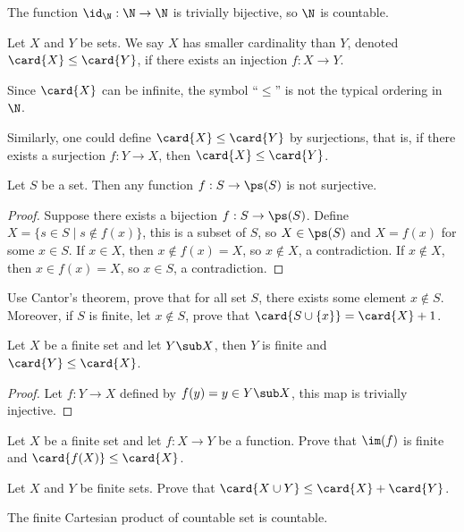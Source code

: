 \documentclass[10pt]{article}
\begin{document}
\par
The function ${\id}_{\N}:\N\to\N$ is trivially bijective, so $\N$ is countable.
\begin{definition}
    Let $X$ and $Y$ be sets. We say $X$ has smaller cardinality than $Y$, denoted $\card{X}\le\card{Y}$, if there exists an injection $f:X\to Y$.
\end{definition}
\begin{remark}
    Since $\card{X}$ can be infinite, the symbol ``$\le$'' is not the typical ordering in $\N$.
\end{remark}
\par
Similarly, one could define $\card{X}\le\card{Y}$ by surjections, that is, if there exists a surjection $f:Y\to X$, then $\card{X}\le\card{Y}$.
\begin{theorem}
    Let $S$ be a set. Then any function $f:S\to\ps(S)$ is not surjective.
\end{theorem}
\begin{proof}
    Suppose there exists a bijection $f:S\to\ps(S)$. Define $X=\{s\in S\mid s\notin f(x)\}$, this is a subset of $S$, so $X\in\ps(S)$ and $X=f(x)$ for some $x\in S$. If $x\in X$, then $x\notin f(x)=X$, so $x\notin X$, a contradiction. If $x\notin X$, then $x\in f(x)=X$, so $x\in S$, a contradiction.
\end{proof}
\begin{problem}
    Use Cantor's theorem, prove that for all set $S$, there exists some element $x\notin S$. Moreover, if $S$ is finite, let $x\notin S$, prove that $\card{S\cup\{x\}}=\card{X}+1$.
\end{problem}
\begin{proposition}
    Let $X$ be a finite set and let $Y\sub X$, then $Y$ is finite and $\card{Y}\le\card{X}$.
\end{proposition}
\begin{proof}
    Let $f:Y\to X$ defined by $f(y)=y\in Y\sub X$, this map is trivially injective.
\end{proof}
\begin{problem}
    Let $X$ be a finite set and let $f:X\to Y$ be a function. Prove that $\im(f)$ is finite and $\card{f(X)}\le\card{X}$.
\end{problem}
\begin{problem}
    Let $X$ and $Y$ be finite sets. Prove that $\card{X\cup Y}\le\card{X}+\card{Y}$.
\end{problem}
\begin{proposition}
    The finite Cartesian product of countable set is countable.
\end{proposition}
\end{document}
